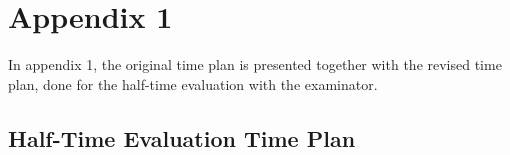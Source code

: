 \chapter{Appendix 1}\label{cha:appendix1}


In appendix 1, the original time plan is presented together with the revised time plan, done for the half-time evaluation with the examinator.



\section{Half-Time Evaluation Time Plan}
